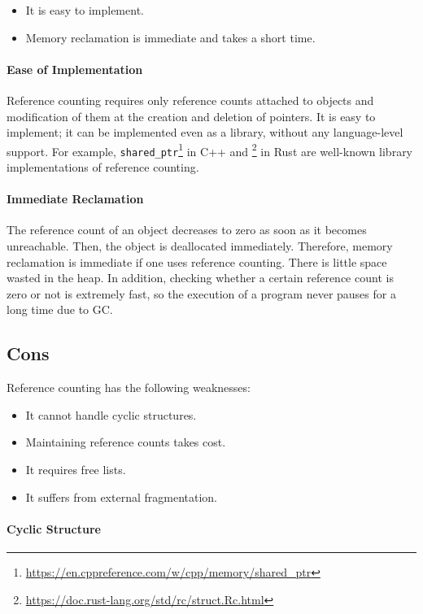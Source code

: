 \begin{itemize}
  \item It is easy to implement.
  \item Memory reclamation is immediate and takes a short time.
\end{itemize}

\paragraph{Ease of Implementation}

Reference counting requires only reference counts attached to objects
and modification of them at the creation and deletion of pointers. It is
easy to implement; it can be implemented even as a library, without any
language-level support. For example,
\verb!shared_ptr!\footnote{\url{https://en.cppreference.com/w/cpp/memory/shared_ptr}}
in C++ and
\footnote{\url{https://doc.rust-lang.org/std/rc/struct.Rc.html}} in
Rust are well-known library implementations of reference counting.

\paragraph{Immediate Reclamation}

The reference count of an object decreases to zero as soon as it becomes
unreachable. Then, the object is deallocated immediately. Therefore, memory
reclamation is immediate if one uses reference counting. There is little space
wasted in the heap. In addition, checking whether a certain reference count is
zero or not is extremely fast, so the execution of a program never pauses for a
long time due to GC.

\subsection{Cons}

Reference counting has the following weaknesses:

\begin{itemize}
  \item It cannot handle cyclic structures.
  \item Maintaining reference counts takes cost.
  \item It requires free lists.
  \item It suffers from external fragmentation.
\end{itemize}

\paragraph{Cyclic Structure}

